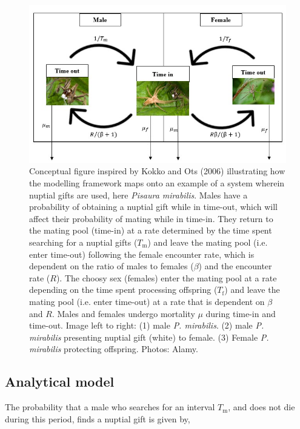 \documentclass[
]{article}
\begin{document}
\begin{figure}
\includegraphics[width=1\linewidth]{inst/img/conceptual_figure} \caption{Conceptual figure inspired by Kokko and Ots (2006) illustrating how the modelling framework maps onto an example of a system wherein nuptial gifts are used, here \textit{Pisaura mirabilis}. Males have a probability of obtaining a nuptial gift while in time-out, which will affect their probability of mating while in time-in. They return to the mating pool (time-in) at a rate determined by the time spent searching for a nuptial gifts ($T_{\mathrm{m}}$) and leave the mating pool (i.e. enter time-out) following the female encounter rate, which is dependent on the ratio of males to females ($\beta$) and the encounter rate ($R$). The choosy sex (females) enter the mating pool at a rate depending on the time spent processing offspring ($T_{\mathrm{f}}$) and leave the mating pool (i.e. enter time-out) at a rate that is dependent on $\beta$ and $R$. Males and females undergo mortality $\mu$ during time-in and time-out. Image left to right: (1) male \textit{P. mirabilis}. (2) male \textit{P. mirabilis} presenting nuptial gift (white) to female. (3) Female \textit{P. mirabilis} protecting offspring. Photos: Alamy.}\label{fig:unnamed-chunk-2}
\end{figure}

\hypertarget{analytical-model}{%
\subsection{Analytical model}\label{analytical-model}}

The probability that a male who searches for an interval
\(T_{\mathrm{m}}\), and does not die during this period, finds a nuptial
gift is given by,
\end{document}

